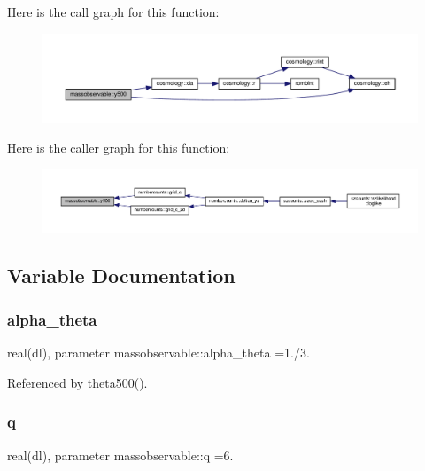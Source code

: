 Here is the call graph for this function\+:
\nopagebreak
\begin{figure}[H]
\begin{center}
\leavevmode
\includegraphics[width=350pt]{namespacemassobservable_a4eca145d43dd43892e21b73f42ace63e_cgraph}
\end{center}
\end{figure}
Here is the caller graph for this function\+:
\nopagebreak
\begin{figure}[H]
\begin{center}
\leavevmode
\includegraphics[width=350pt]{namespacemassobservable_a4eca145d43dd43892e21b73f42ace63e_icgraph}
\end{center}
\end{figure}


\subsection{Variable Documentation}
\mbox{\label{namespacemassobservable_a5a2fa41bd7c65ad6bcb80c5a33cb9b2a}} 
\subsubsection{\texorpdfstring{alpha\+\_\+theta}{alpha\_theta}}
{\footnotesize\ttfamily real(dl), parameter massobservable\+::alpha\+\_\+theta =1./3.}



Referenced by theta500().

\mbox{\label{namespacemassobservable_adc6186979c0880b189270b9d6fa1f933}} 
\subsubsection{\texorpdfstring{q}{q}}
{\footnotesize\ttfamily real(dl), parameter massobservable\+::q =6.}



